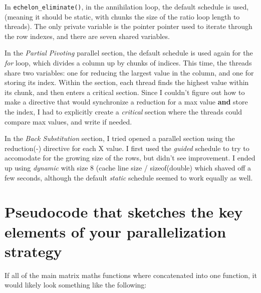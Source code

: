 \documentclass[a4paper,12pt]{article}
\begin{document}
    In \texttt{echelon\_eliminate()}, in the annihilation loop, the default
    schedule is used, (meaning it should be static, with chunks the size of
    the ratio loop length to threads). The only private variable is the
    pointer pointer used to iterate through the row indexes, and there are
    seven shared variables.

    In the \emph{Partial Pivoting} parallel section, the default schedule is
    used again for the \emph{for} loop, which divides a column up by chunks of
    indices. This time, the threads share two variables: one for reducing the
    largest value in the column, and one for storing its index. Within the
    section, each thread finds the highest value within its chunk, and then
    enters a critical section. Since I couldn't figure out how to make a
    directive that would synchronize a reduction for a max value \textbf{and}
    store the index, I had to explicitly create a \emph{critical} section where
    the threads could compare max values, and write if needed.

    In the \emph{Back Substitution} section, I tried opened a parallel section
    using the reduction(-) directive for each X value. I first used the \emph{guided}
    schedule to try to accomodate for the growing size of the rows, but didn't see
    improvement. I ended up using \emph{dynamic} with size 8 (cache line size / sizeof(double)
    which shaved off a few seconds, although the default \emph{static} schedule seemed to
    work equally as well.

\section{Pseudocode that sketches the key elements of your parallelization strategy}

    If all of the main matrix maths functions where concatenated into one function, it
    would likely look something like the following:
\end{document}
